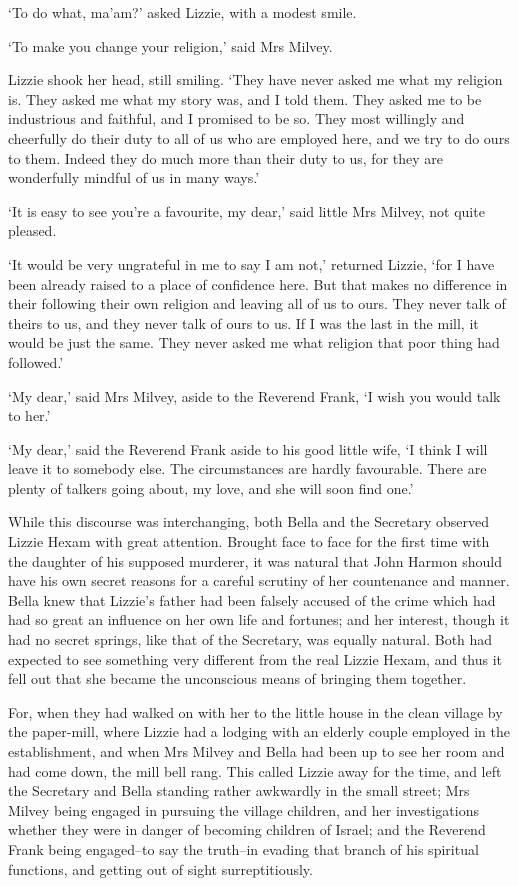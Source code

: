 ‘To do what, ma’am?’ asked Lizzie, with a modest smile.

‘To make you change your religion,’ said Mrs Milvey.

Lizzie shook her head, still smiling. ‘They have never asked me what
my religion is. They asked me what my story was, and I told them. They
asked me to be industrious and faithful, and I promised to be so.
They most willingly and cheerfully do their duty to all of us who are
employed here, and we try to do ours to them. Indeed they do much more
than their duty to us, for they are wonderfully mindful of us in many
ways.’

‘It is easy to see you’re a favourite, my dear,’ said little Mrs Milvey,
not quite pleased.

‘It would be very ungrateful in me to say I am not,’ returned Lizzie,
‘for I have been already raised to a place of confidence here. But that
makes no difference in their following their own religion and leaving
all of us to ours. They never talk of theirs to us, and they never talk
of ours to us. If I was the last in the mill, it would be just the same.
They never asked me what religion that poor thing had followed.’

‘My dear,’ said Mrs Milvey, aside to the Reverend Frank, ‘I wish you
would talk to her.’

‘My dear,’ said the Reverend Frank aside to his good little wife, ‘I
think I will leave it to somebody else. The circumstances are hardly
favourable. There are plenty of talkers going about, my love, and she
will soon find one.’

While this discourse was interchanging, both Bella and the Secretary
observed Lizzie Hexam with great attention. Brought face to face for the
first time with the daughter of his supposed murderer, it was natural
that John Harmon should have his own secret reasons for a careful
scrutiny of her countenance and manner. Bella knew that Lizzie’s
father had been falsely accused of the crime which had had so great an
influence on her own life and fortunes; and her interest, though it had
no secret springs, like that of the Secretary, was equally natural. Both
had expected to see something very different from the real Lizzie Hexam,
and thus it fell out that she became the unconscious means of bringing
them together.

For, when they had walked on with her to the little house in the clean
village by the paper-mill, where Lizzie had a lodging with an elderly
couple employed in the establishment, and when Mrs Milvey and Bella
had been up to see her room and had come down, the mill bell rang.
This called Lizzie away for the time, and left the Secretary and Bella
standing rather awkwardly in the small street; Mrs Milvey being engaged
in pursuing the village children, and her investigations whether they
were in danger of becoming children of Israel; and the Reverend Frank
being engaged--to say the truth--in evading that branch of his spiritual
functions, and getting out of sight surreptitiously.

